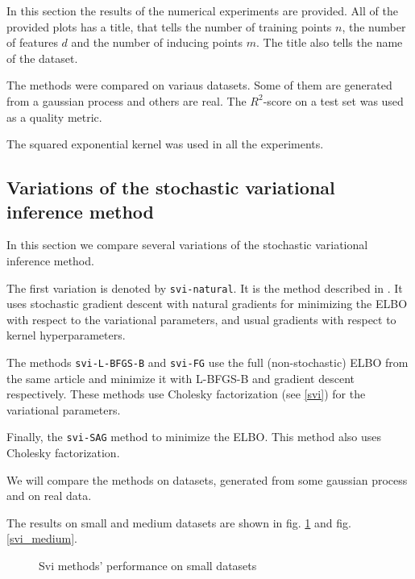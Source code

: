 In this section the results of the numerical experiments are provided. All of the provided plots has a title, that tells the number of training points $n$, the number of features $d$ and the number of inducing points $m$. The title also tells the name of the dataset.

	The methods were compared on variaus datasets. Some of them are generated from a gaussian process and others are real. The $R^2$-score on a test set was used as a quality metric. 

	The squared exponential kernel was used in all the experiments.

	\subsection{Variations of the stochastic variational inference method}
		In this section we compare several variations of the stochastic variational inference method.

		The first variation is denoted by \lstinline{svi-natural}. It is the method described in \cite{BigData}. It uses stochastic gradient descent with natural gradients for minimizing the ELBO with respect to the variational parameters, and usual gradients with respect to kernel hyperparameters.

		The methods \lstinline{svi-L-BFGS-B} and \lstinline{svi-FG} use the full (non-stochastic) ELBO from the same article \cite{BigData} and minimize it with L-BFGS-B and gradient descent respectively. These methods use Cholesky factorization (see \ref{svi}) for the variational parameters.

		Finally, the \lstinline{svi-SAG} method to minimize the ELBO. This method also uses Cholesky factorization.

		We will compare the methods on datasets, generated from some gaussian process and on real data. 


		The results on small and medium datasets are shown in fig. \ref{svi_small} and fig. \ref{svi_medium}.

		\begin{figure}[h!]
			\centering

			\subfloat{
				\scalebox{0.75}{
					
				}
			}
			\subfloat{
				\scalebox{0.75}{
		    		
				}
			}
			\vspace{0.1cm}
			\caption{Svi methods' performance on small datasets}
			\label{svi_small}
		\end{figure}


